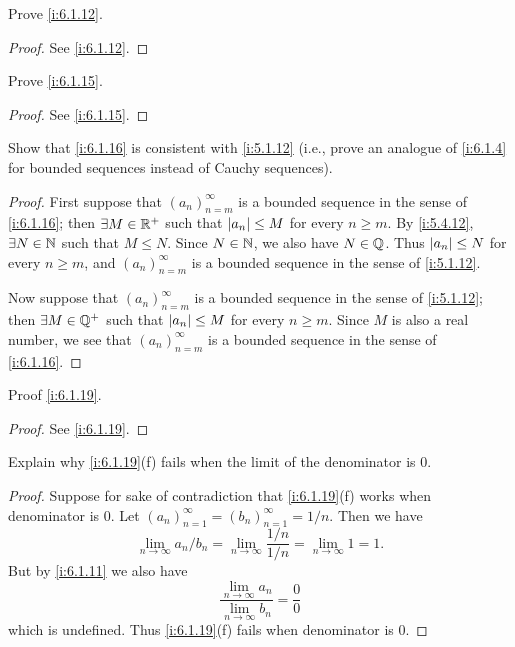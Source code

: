\begin{ex}\label{i:ex:6.1.5}
  Prove \cref{i:6.1.12}.
\end{ex}

\begin{proof}
  See \cref{i:6.1.12}.
\end{proof}

\begin{ex}\label{i:ex:6.1.6}
  Prove \cref{i:6.1.15}.
\end{ex}

\begin{proof}
  See \cref{i:6.1.15}.
\end{proof}

\begin{ex}\label{i:ex:6.1.7}
  Show that \cref{i:6.1.16} is consistent with \cref{i:5.1.12}
  (i.e., prove an analogue of \cref{i:6.1.4} for bounded sequences instead of Cauchy sequences).
\end{ex}

\begin{proof}
  First suppose that \((a_n)_{n = m}^\infty\) is a bounded sequence in the sense of \cref{i:6.1.16};
  then \(\exists M \in \mathbb{R}^+\) such that \(\left\lvert a_n\right\rvert \leq M\) for every \(n \geq m\).
  By \cref{i:5.4.12}, \(\exists N \in \mathbb{N}\) such that \(M \leq N\).
  Since \(N \in \mathbb{N}\), we also have \(N \in \mathbb{Q}\).
  Thus \(\left\lvert a_n\right\rvert \leq N\) for every \(n \geq m\), and \((a_n)_{n = m}^\infty\) is a bounded sequence in the sense of \cref{i:5.1.12}.

  Now suppose that \((a_n)_{n = m}^\infty\) is a bounded sequence in the sense of \cref{i:5.1.12};
  then \(\exists M \in \mathbb{Q}^+\) such that \(\left\lvert a_n\right\rvert \leq M\) for every \(n \geq m\).
  Since \(M\) is also a real number, we see that \((a_n)_{n = m}^\infty\) is a bounded sequence in the sense of \cref{i:6.1.16}.
\end{proof}

\begin{ex}\label{i:ex:6.1.8}
  Proof \cref{i:6.1.19}.
\end{ex}

\begin{proof}
  See \cref{i:6.1.19}.
\end{proof}

\begin{ex}\label{i:ex:6.1.9}
  Explain why \cref{i:6.1.19}(f) fails when the limit of the denominator is \(0\).
\end{ex}

\begin{proof}
  Suppose for sake of contradiction that \cref{i:6.1.19}(f) works when denominator is \(0\).
  Let \((a_n)_{n = 1}^\infty = (b_n)_{n = 1}^\infty = 1 / n\).
  Then we have
  \[
    \lim_{n \to \infty} a_n / b_n = \lim_{n \to \infty} \dfrac{1 / n}{1 / n} = \lim_{n \to \infty} 1 = 1.
  \]
  But by \cref{i:6.1.11} we also have
  \[
    \dfrac{\lim_{n \to \infty} a_n}{\lim_{n \to \infty} b_n} = \dfrac{0}{0}
  \]
  which is undefined.
  Thus \cref{i:6.1.19}(f) fails when denominator is \(0\).
\end{proof}


